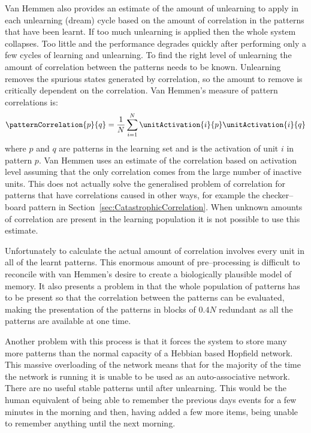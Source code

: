 Van Hemmen also provides an estimate of the amount of unlearning to apply in each unlearning (dream) cycle based on the amount of correlation in the patterns that have been learnt.  If too much unlearning is applied then the whole system collapses. Too little and the performance degrades quickly after performing only a few cycles of learning and unlearning.  To find the right level of unlearning the amount of correlation between the patterns needs to be known.  Unlearning removes the spurious states generated by correlation, so the amount to remove is critically dependent on the correlation. Van Hemmen's measure of pattern correlations is:
\begin{equation}
	\patternCorrelation{p}{q} = \frac{1}{N}\sum_{i=1}^{N}\unitActivation{i}{p}\unitActivation{i}{q}
	\label{eq:Correlation}
\end{equation}
where $p$ and $q$ are patterns in the learning set and  is the activation of unit $i$ in pattern $p$.  Van Hemmen uses an estimate of the correlation based on activation level assuming that the only correlation comes from the large number of inactive units. This does not actually solve the generalised problem of correlation for patterns that have correlations caused in other ways, for example the checker--board pattern in Section~\ref{sec:CatastrophicCorrelation}.  When unknown amounts of correlation are present in the learning population it is not possible to use this estimate.

Unfortunately to calculate the actual amount of correlation  involves every unit in all of the learnt patterns.  This enormous amount of pre--processing is difficult to reconcile with van Hemmen's desire to create a biologically plausible model of memory.  It also presents a problem in that the whole population of patterns has to be present so that the correlation between the patterns can be evaluated, making the presentation of the patterns in blocks of $0.4N$ redundant as all the patterns are available at one time.

Another problem with this process is that it forces the system to store many more patterns than the normal capacity of a Hebbian based Hopfield network. This massive overloading of the network means that for the majority of the time the network is running it is unable to be used as an auto-associative network.  There are no useful stable patterns until after unlearning.  This would be the human equivalent of being able to remember the previous days events for a few minutes in the morning and then, having added a few more items, being unable to remember anything until the next morning.

